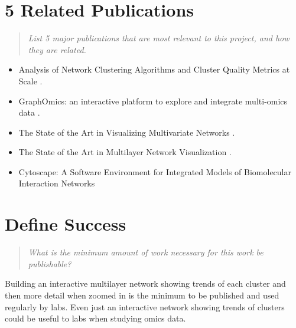 \documentclass{proc}
\begin{document}
\section{5 Related Publications}
\begin{quote}
\textit{List 5 major publications that are most relevant to this project, and how they are related.}
\end{quote}

\begin{itemize}
    \item Analysis of Network Clustering Algorithms and Cluster Quality Metrics at Scale \cite{Emmons2016}.
    \item GraphOmics: an interactive platform to explore and integrate multi-omics data \cite{Wandy2021}.
    \item The State of the Art in Visualizing Multivariate Networks \cite{Nobre2019}.
    \item The State of the Art in Multilayer Network Visualization \cite{McGee2019}.
    \item Cytoscape: A Software Environment for Integrated Models of Biomolecular Interaction Networks \cite{Shannon2003}
\end{itemize}

\section{Define Success}
\begin{quote}
\textit{What is the minimum amount of work necessary for this work be publishable?}
\end{quote}

Building an interactive multilayer network showing trends of each cluster and then more detail when zoomed in is the minimum to be published and used regularly by labs. Even just an interactive network showing trends of clusters could be useful to labs when studying omics data.



\end{document}

